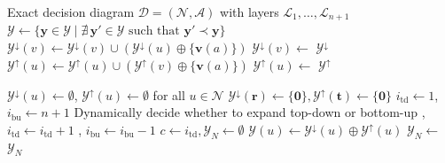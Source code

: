 \documentclass[letterpaper]{article}
\begin{document}
\begin{algorithm}[tbp!]
\caption{Coupled Pareto Frontier Enumeration}
\label{alg:coupled_pf}
\begin{algorithmic}[1]
\Require Exact decision diagram $\mathcal{D} = (\mathcal{N}, \mathcal{A})$ with layers $\mathcal{L}_1, \dots, \mathcal{L}_{n+1}$
 
    \State \Return $\mathcal{Y} \gets \{ \mathbf{y} \in \mathcal{Y} \mid \nexists \, \mathbf{y}' \in \mathcal{Y} \text{ such that } \mathbf{y}' \prec \mathbf{y} \}$
\EndProcedure
{}
            \State $\mathcal{Y}^{\downarrow}(v) \gets \mathcal{Y}^{\downarrow}(v) \cup (\mathcal{Y}^{\downarrow}(u) \oplus \{\mathbf{v}(a)\})$
            \State $\mathcal{Y}^{\downarrow}(v) \gets$ 
        \EndFor
    \EndFor
    \State \Return $\mathcal{Y}^{\downarrow}$
\EndProcedure
{}
            \State $\mathcal{Y}^{\uparrow}(u) \gets \mathcal{Y}^{\uparrow}(u) \cup (\mathcal{Y}^{\uparrow}(v) \oplus \{\mathbf{v}(a)\})$
            \State $\mathcal{Y}^{\uparrow}(u) \gets$ 
        \EndFor
    \EndFor
    \State \Return $\mathcal{Y}^{\uparrow}$
\EndProcedure

\State $\mathcal{Y}^{\downarrow}(u) \gets \emptyset$, $\mathcal{Y}^{\uparrow}(u) \gets \emptyset$ for all $u \in \mathcal{N}$
\State $\mathcal{Y}^{\downarrow}(\mathbf{r}) \gets \{\mathbf{0}\}, \mathcal{Y}^{\uparrow}(\mathbf{t}) \gets \{\mathbf{0}\}$ 
\State $i_{\text{td}} \gets 1$, $i_{\text{bu}} \gets n+1$
    \State Dynamically decide whether to expand top-down or bottom-up
        \State {}, $i_{\text{td}} \gets i_{\text{td}} + 1$
    \Else
        \State {}, $i_{\text{bu}} \gets i_{\text{bu}} - 1$
    \EndIf
\EndWhile
\State $c \gets i_{\text{td}}, \mathcal{Y}_N \gets \emptyset$
    \State $\mathcal{Y}(u) \gets \mathcal{Y}^{\downarrow}(u) \oplus \mathcal{Y}^{\uparrow}(u)$ 
\EndFor
{}
    \State $\mathcal{Y}_N \gets$ 
\EndFor
\State \Return $\mathcal{Y}_N$
\end{algorithmic}
\end{algorithm}
\end{document}
